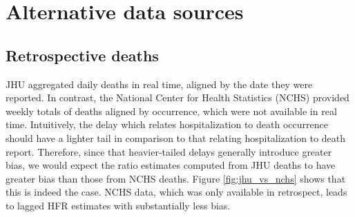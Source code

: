 \documentclass{article}
\begin{document}


\section{Alternative data sources}
\label{apx:alternatives}

\subsection{Retrospective deaths}
\label{apx:NCHS_deaths}

JHU aggregated daily deaths in real time, aligned by the date they were
reported. In contrast, the National Center for Health Statistics (NCHS) provided
weekly totals of deaths aligned by occurrence, which were not available in real  
time. Intuitively, the delay which relates hospitalization to death occurrence
should have a lighter tail in comparison to that relating hospitalization to
death report. Therefore, since that heavier-tailed delays generally introduce
greater bias, we would expect the ratio estimates computed from JHU deaths to
have greater bias than those from NCHS deaths. Figure \ref{fig:jhu_vs_nchs}
shows that this is indeed the case. NCHS data, which was only available in
retrospect, leads to lagged HFR estimates with substantially less bias.    
\end{document}
